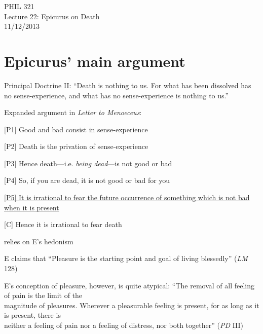 \documentclass[11pt]{article}
\begin{document}
\thispagestyle{empty}
\begin{center} \LARGE{PHIL 321\\ Lecture 22: Epicurus on Death}\\ \vspace*{2mm}
\large{11/12/2013}\end{center}
\thispagestyle{empty}\vspace*{3mm}
\vspace*{-8mm}

\section*{Epicurus' main argument}

\noindent Principal Doctrine II: ``Death is nothing to us. For what has been dissolved has no sense-experience, and what has no sense-experience is nothing to us.''
\vspace*{2mm}

\noindent Expanded argument in \emph{Letter to Menoeceus}:
\vspace*{2mm}

[P1] Good and bad consist in sense-experience
\vspace*{1mm}

[P2] Death is the privation of sense-experience
\vspace*{1mm}

[P3] Hence death---i.e. \emph{being dead}---is not good or bad
\vspace*{1mm}

[P4] So, if you are dead, it is not good or bad for you
\vspace*{1mm}

\underline{[P5] It is irrational to fear the future occurrence of something which is not bad when it is present}
\vspace*{1mm}

[C] Hence it is irrational to fear death
\vspace{2mm}

\noindent [P1] relies on E's hedonism
\vspace*{1mm}

E claims that ``Pleasure is the starting point and goal of living blessedly'' (\emph{LM} 128)
\vspace*{1mm}

E's conception of pleasure, however, is quite atypical: ``The removal of all feeling of pain is the limit of the\\\hspace*{6mm}magnitude of pleasures. Wherever a pleasurable feeling is present, for as long as it is present, there is\\\hspace*{6mm}neither a feeling of pain nor a feeling of distress, nor both together'' (\emph{PD} III)
\vspace*{2mm}
\end{document}
